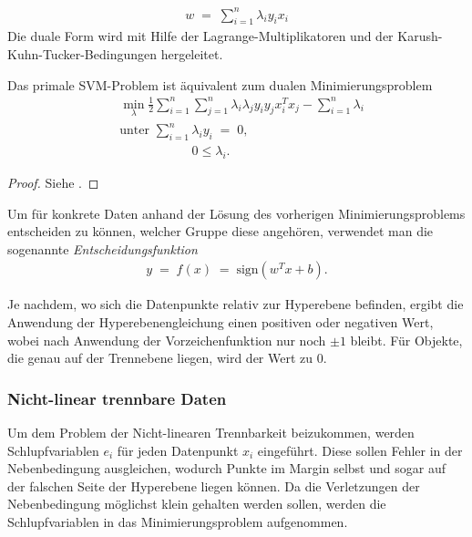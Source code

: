 \begin{align*}
	w\;=\;\sum_{i=1}^{n}\lambda_i y_i x_i
\end{align*}
Die duale Form wird mit Hilfe der Lagrange-Multiplikatoren und der Karush-Kuhn-Tucker-Bedingungen hergeleitet.

\newpage
\begin{satz}
	Das primale SVM-Problem ist äquivalent zum dualen Minimierungsproblem
	\begin{align*}
		&\min_{\lambda} \frac{1}{2}\sum_{i=1}^{n}\sum_{j=1}^{n}\lambda_i\lambda_jy_iy_jx_i^Tx_j-\sum_{i=1}^{n}\lambda_i\\
		&\text{unter } \sum_{i=1}^{n}\lambda_iy_i\;=\;0,\\
		&\qquad\qquad\quad\:\:\: 0\leq\lambda_i.
	\end{align*}
\end{satz}

\begin{proof}
	Siehe \cite{SVM}.
\end{proof}

\begin{defi}[Entscheidungsfunktion]
	Um für konkrete Daten anhand der Lösung des vorherigen Minimierungsproblems entscheiden zu können, welcher Gruppe diese angehören, verwendet man die sogenannte \textit{Entscheidungsfunktion}
	\begin{align*}
		y\;=\;f(x)\;=\;\text{sign}\left(w^Tx+b\right).
	\end{align*}
	\label{defi:decision}
\end{defi}
Je nachdem, wo sich die Datenpunkte relativ zur Hyperebene befinden, ergibt die Anwendung der Hyperebenengleichung einen positiven oder negativen Wert, wobei nach Anwendung der Vorzeichenfunktion nur noch \(\pm1\) bleibt. Für Objekte, die genau auf der Trennebene liegen, wird der Wert zu \(0\).

\subsubsection{Nicht-linear trennbare Daten}

Um dem Problem der Nicht-linearen Trennbarkeit beizukommen, werden Schlupfvariablen \(e_i\) für jeden Datenpunkt \(x_i\) eingeführt. Diese sollen Fehler in der Nebenbedingung ausgleichen, wodurch Punkte im Margin selbst und sogar auf der falschen Seite der Hyperebene liegen können. Da die Verletzungen der Nebenbedingung möglichst klein gehalten werden sollen, werden die Schlupfvariablen in das Minimierungsproblem aufgenommen.

